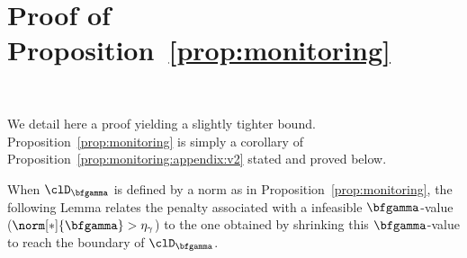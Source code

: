 \section{Proof of Proposition~\ref{prop:monitoring}}~\label{sec:proof:prop:monitoring}

We detail here a proof yielding a slightly tighter bound. 
Proposition~\ref{prop:monitoring} is simply a corollary of
Proposition~\ref{prop:monitoring:appendix:v2} stated and proved below.

When $\clD_{\bfgamma}$ is defined by a norm as in
Proposition~\ref{prop:monitoring}, the following Lemma relates the penalty
associated with a infeasible $\bfgamma$-value 
($\norm[*]{\bfgamma} > \eta_\gamma$) to the one obtained by shrinking this
$\bfgamma$-value to reach the boundary of $\clD_{\bfgamma}$.

